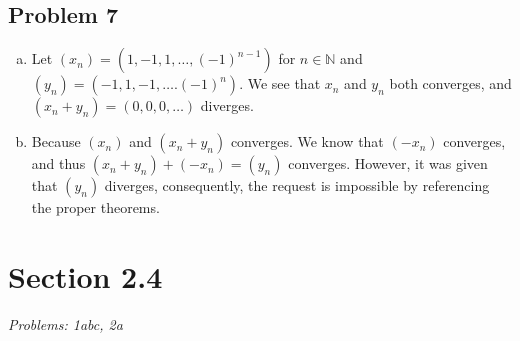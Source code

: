 \documentclass[12pt]{article}
\begin{document}
\subsection*{Problem 7}
\begin{enumerate}[a).]
    \item {
    Let $(x_n) = (1, -1, 1, \dots, (-1)^{n-1})$ for $n \in \mathbb{N}$ and $(y_n) = (-1, 1, -1, \dots. (-1)^{n})$.
    We see that $x_n$ and $y_n$ both converges, and $(x_n + y_n) = (0,0,0,\dots)$ diverges. 
    }

    \item {
    Because $(x_n)$ and $(x_n + y_n)$ converges. 
    We know that $(-x_n)$ converges, and thus $(x_n + y_n) + (-x_n) = (y_n)$ converges.
    However, it was given that $(y_n)$ diverges, consequently, the request is impossible by referencing the proper theorems. 
    }
\end{enumerate}




\vspace*{1cm}

\section*{Section 2.4}
\textit{Problems: 1abc, 2a}
\end{document}
